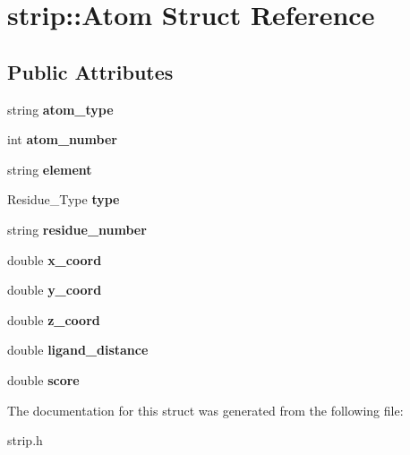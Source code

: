 \hypertarget{structstrip_1_1Atom}{
\section{strip::Atom Struct Reference}
\label{structstrip_1_1Atom}
}
\subsection*{Public Attributes}
\begin{DoxyCompactItemize}
\item 
\hypertarget{structstrip_1_1Atom_a10480f2d665427b55ca40b6a5581bba6}{
string {\bfseries atom\_\-type}}
\label{structstrip_1_1Atom_a10480f2d665427b55ca40b6a5581bba6}

\item 
\hypertarget{structstrip_1_1Atom_a572170b948e5689c8a478903fc7bb64b}{
int {\bfseries atom\_\-number}}
\label{structstrip_1_1Atom_a572170b948e5689c8a478903fc7bb64b}

\item 
\hypertarget{structstrip_1_1Atom_a0690257699232f37a0489847b947c1ec}{
string {\bfseries element}}
\label{structstrip_1_1Atom_a0690257699232f37a0489847b947c1ec}

\item 
\hypertarget{structstrip_1_1Atom_a52f5a30b6b0f3a2ab726b0e29c08cab5}{
Residue\_\-Type {\bfseries type}}
\label{structstrip_1_1Atom_a52f5a30b6b0f3a2ab726b0e29c08cab5}

\item 
\hypertarget{structstrip_1_1Atom_acf2a6dad215bc7cf6cd624b19f1b127f}{
string {\bfseries residue\_\-number}}
\label{structstrip_1_1Atom_acf2a6dad215bc7cf6cd624b19f1b127f}

\item 
\hypertarget{structstrip_1_1Atom_a35e3c62dfe3785699e830889d29b702f}{
double {\bfseries x\_\-coord}}
\label{structstrip_1_1Atom_a35e3c62dfe3785699e830889d29b702f}

\item 
\hypertarget{structstrip_1_1Atom_a1fced196458f8a6fed5a602c1a76b58f}{
double {\bfseries y\_\-coord}}
\label{structstrip_1_1Atom_a1fced196458f8a6fed5a602c1a76b58f}

\item 
\hypertarget{structstrip_1_1Atom_a4419e06284250f139d6754186c195005}{
double {\bfseries z\_\-coord}}
\label{structstrip_1_1Atom_a4419e06284250f139d6754186c195005}

\item 
\hypertarget{structstrip_1_1Atom_a08437951c94b3d47186d070b54dba4eb}{
double {\bfseries ligand\_\-distance}}
\label{structstrip_1_1Atom_a08437951c94b3d47186d070b54dba4eb}

\item 
\hypertarget{structstrip_1_1Atom_a54e663046ee17ba1160a19e19c3d78e2}{
double {\bfseries score}}
\label{structstrip_1_1Atom_a54e663046ee17ba1160a19e19c3d78e2}

\end{DoxyCompactItemize}


The documentation for this struct was generated from the following file:\begin{DoxyCompactItemize}
\item 
strip.h\end{DoxyCompactItemize}
